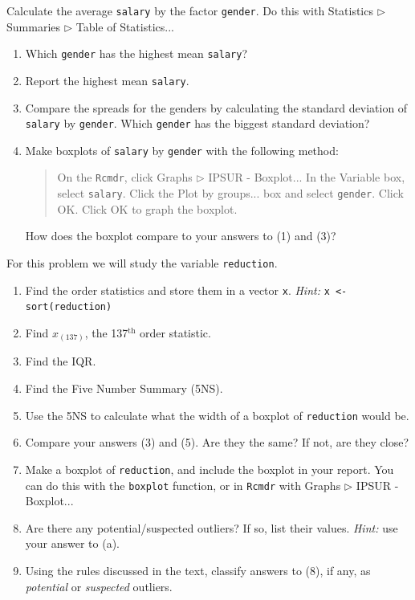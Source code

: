\documentclass[captions=tableheading]{scrbook}
\begin{document}
\begin{xca}
Calculate the average \texttt{salary} by the factor \texttt{gender}. Do this with \textsf{Statistics} \textsf{\(\triangleright\) Summaries} \textsf{\(\triangleright\) Table of Statistics}... 
\begin{enumerate}
\item Which \texttt{gender} has the highest mean \texttt{salary}?
\item Report the highest mean \texttt{salary}.
\item Compare the spreads for the genders by calculating the standard deviation of \texttt{salary} by \texttt{gender}. Which \texttt{gender} has the biggest standard deviation?
\item Make boxplots of \texttt{salary} by \texttt{gender} with the following method:
   \begin{quote}
   On the \texttt{Rcmdr}, click \textsf{Graphs} \textsf{\(\triangleright\)} \textsf{IPSUR - Boxplot}...
   In the \textsf{Variable} box, select \texttt{salary}.
   Click the \textsf{Plot by groups}... box and select \texttt{gender}. Click \textsf{OK}.
   Click \textsf{OK} to graph the boxplot.
   \end{quote}
   How does the boxplot compare to your answers to (1) and (3)?
\end{enumerate}
\end{xca}

\begin{xca}
For this problem we will study the variable \texttt{reduction}.
\begin{enumerate}
\item Find the order statistics and store them in a vector \texttt{x}. \emph{Hint:} \texttt{x <- sort(reduction)}
\item Find \(x_{(137)}\), the 137\(^{\mathrm{th}}\) order statistic.
\item Find the IQR.
\item Find the Five Number Summary (5NS).
\item Use the 5NS to calculate what the width of a boxplot of \texttt{reduction} would be.
\item Compare your answers (3) and (5). Are they the same? If not, are they close?
\item Make a boxplot of \texttt{reduction}, and include the boxplot in your report. You can do this with the \texttt{boxplot} function, or in \texttt{Rcmdr} with \textsf{Graphs} \textsf{\(\triangleright\)} \textsf{IPSUR - Boxplot}...
\item Are there any potential/suspected outliers? If so, list their values. \emph{Hint:} use your answer to (a).
\item Using the rules discussed in the text, classify answers to (8), if any, as \emph{potential} or \emph{suspected} outliers.
\end{enumerate}
\end{xca}
\end{document}
